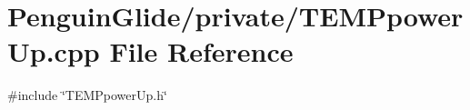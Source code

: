 \section{Penguin\+Glide/private/\+T\+E\+M\+Ppower\+Up.cpp File Reference}
\label{_t_e_m_ppower_up_8cpp}
{\ttfamily \#include \char`\"{}T\+E\+M\+Ppower\+Up.\+h\char`\"{}}\newline
